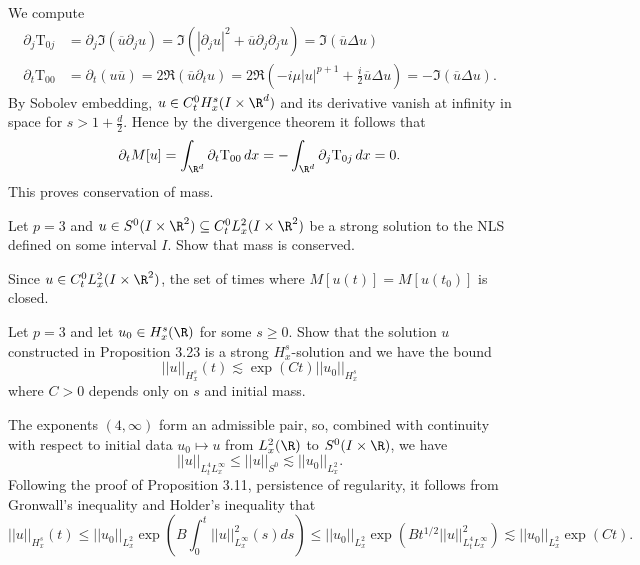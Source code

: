 \begin{solution}
	We compute
		\begin{align*}
			 \partial_j \text{T}_{0j} 
			 	&= \partial_j \Im (\overline u \partial_j u) = \Im (|\partial_j u|^2 + \overline u \partial_j \partial_j u) = \Im( \overline u \Delta u) \\
			 \partial_t \text{T}_{00} 
			 	&= \partial_t (u \overline u) = 2 \Re (\overline u \partial_t u) = 2 \Re \left(-i \mu |u|^{p + 1} + \frac{i}{2}\overline u \Delta u\right) = - \Im (\overline u \Delta u).
		\end{align*}	 	
	By Sobolev embedding, $u \in C^0_t H^s_x (I \times \R^d)$ and its derivative vanish at infinity in space for $s > 1 + \tfrac{d}{2}$. Hence by the divergence theorem it follows that 
		\[ \partial_t M[u] = \int_{\R^d} \partial_t \text{T}_{00} \, dx = - \int_{\R^d} \partial_j \text{T}_{0j} \, dx = 0. \]
	This proves conservation of mass. 
\end{solution}

\begin{statement}
	Let $p = 3$ and $u \in S^0 (I \times \R^2) \subseteq C^0_t L^2_x (I \times \R^2)$ be a strong solution to the NLS defined on some interval $I$. Show that mass is conserved.
\end{statement}

\begin{solution}
	Since $u \in C^0_t L^2_x (I \times \R^2)$, the set of times where $M[u(t)] = M[u(t_0)]$ is closed.  
\end{solution}

\begin{statement}
	Let $p = 3$ and let $u_0 \in H^s_x (\R)$ for some $s \geq 0$. Show that the solution $u$ constructed in Proposition 3.23 is a strong $H^s_x$-solution and we have the bound
		\[ ||u||_{H^s_x} (t) \lesssim \exp(Ct) ||u_0||_{H^s_x} \]
	where $C > 0$ depends only on $s$ and initial mass. 	
\end{statement}

\begin{solution}
	The exponents $(4, \infty)$ form an admissible pair, so, combined with continuity with respect to initial data $u_0 \mapsto u$ from $L^2_x (\R)$ to $S^0 (I \times \R)$, we have
		\[ ||u||_{L^4_t L^\infty_x} \leq ||u||_{S^0} \lesssim ||u_0||_{L^2_x}. \]
	Following the proof of Proposition 3.11, persistence of regularity, it follows from Gronwall's inequality and Holder's inequality that
		\[ ||u||_{H^s_x} (t) \leq ||u_0 ||_{L^2_x} \exp \left(B \int_0^t || u ||_{L^\infty_x}^2 (s) ds \right)  \leq ||u_0 ||_{L^2_x} \exp \left(B t^{1/2} ||u||_{L^4_t L^\infty_x}^2 \right) \lesssim  ||u_0 ||_{L^2_x}  \exp \left(C t \right).\]
\end{solution}

